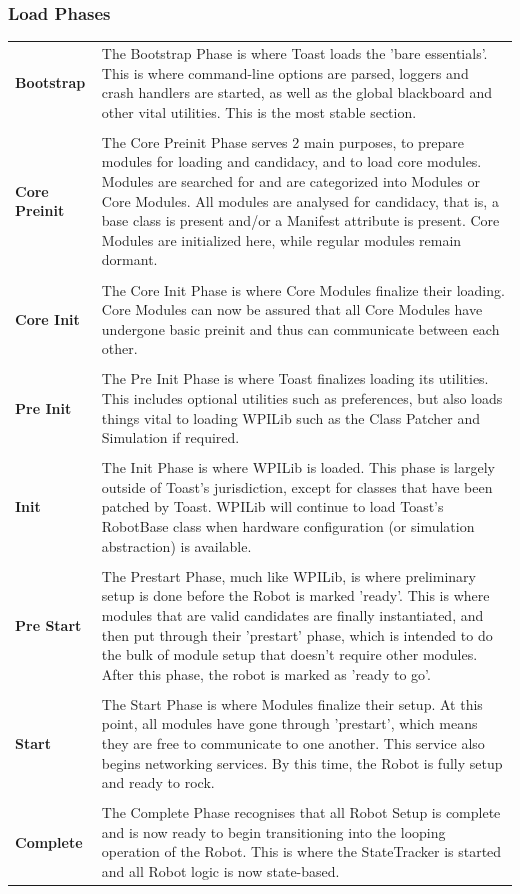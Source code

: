 \documentclass[a4paper,12pt]{article}
\begin{document}
\subsubsection{Load Phases}
\begin{tabular}{p{3cm}p{12.5cm}}
	\textbf{Bootstrap} &
		The Bootstrap Phase is where Toast loads the 'bare essentials'. This is where command-line options are parsed, loggers and crash handlers are started, as well as the global blackboard and other vital utilities. This is the most stable section.\\\\
	\textbf{Core Preinit} &
		The Core Preinit Phase serves 2 main purposes, to prepare modules for loading and candidacy, and to load core modules. Modules are searched for and are categorized into Modules or Core Modules. All modules are analysed for candidacy, that is, a base class is present and/or a Manifest attribute is present. Core Modules are initialized here, while regular modules remain dormant.\\\\
	\textbf{Core Init} &
		The Core Init Phase is where Core Modules finalize their loading. Core Modules can now be assured that all Core Modules have undergone basic preinit and thus can communicate between each other.\\\\
	\textbf{Pre Init} &
		The Pre Init Phase is where Toast finalizes loading its utilities. This includes optional utilities such as preferences, but also loads things vital to loading WPILib such as the Class Patcher and Simulation if required.\\\\
	\textbf{Init} &
		The Init Phase is where WPILib is loaded. This phase is largely outside of Toast's jurisdiction, except for classes that have been patched by Toast. WPILib will continue to load Toast's RobotBase class when hardware configuration (or simulation abstraction) is available.\\\\
	\textbf{Pre Start} &
		The Prestart Phase, much like WPILib, is where preliminary setup is done before the Robot is marked 'ready'. This is where modules that are valid candidates are finally instantiated, and then put through their 'prestart' phase, which is intended to do the bulk of module setup that doesn't require other modules. After this phase, the robot is marked as 'ready to go'.\\\\
	\textbf{Start} &
		The Start Phase is where Modules finalize their setup. At this point, all modules have gone through 'prestart', which means they are free to communicate to one another. This service also begins networking services. By this time, the Robot is fully setup and ready to rock.\\\\
	\textbf{Complete} &
		The Complete Phase recognises that all Robot Setup is complete and is now ready to begin transitioning into the looping operation of the Robot. This is where the StateTracker is started and all Robot logic is now state-based.
\end{tabular}
\end{document}
